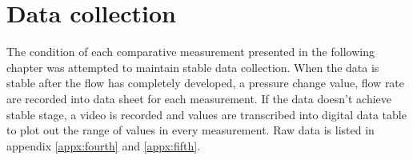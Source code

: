 \section{Data collection}

The condition of each comparative measurement presented in the following chapter was attempted to maintain stable data collection. When the data is stable after the flow has completely developed, a pressure change value, flow rate are recorded into data sheet for each measurement. If the data doesn't achieve stable stage, a video is recorded and values are transcribed into digital data table to plot out the range of values in every measurement. Raw data is listed in appendix \ref{appx:fourth} and \ref{appx:fifth}.

\clearpage %

